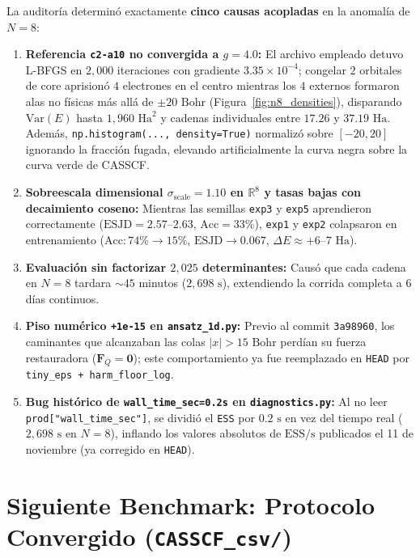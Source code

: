 \documentclass[10pt,a4paper]{article}
\begin{document}
La auditor\'ia determin\'o exactamente \textbf{cinco causas acopladas} en la anomal\'ia de $N=8$:
\begin{enumerate}
\item \textbf{Referencia \texttt{c2-a10} no convergida a $g=4.0$:} El archivo empleado detuvo L-BFGS en $2{,}000$ iteraciones con gradiente $3.35\times 10^{-4}$; congelar $2$ orbitales de core aprision\'o $4$ electrones en el centro mientras los $4$ externos formaron alas no f\'isicas m\'as all\'a de $\pm 20\text{ Bohr}$ (Figura~\ref{fig:n8_densities}), disparando $\mathrm{Var}(E)$ hasta $1{,}960\text{ Ha}^2$ y cadenas individuales entre $17.26$ y $37.19\text{ Ha}$. Adem\'as, \texttt{np.histogram(..., density=True)} normaliz\'o sobre $[-20,20]$ ignorando la fracci\'on fugada, elevando artificialmente la curva negra sobre la curva verde de CASSCF.
\item \textbf{Sobreescala dimensional $\sigma_{\mathrm{scale}}=1.10$ en $\mathbb{R}^8$ y tasas bajas con decaimiento coseno:} Mientras las semillas \texttt{exp3} y \texttt{exp5} aprendieron correctamente ($\mathrm{ESJD}=2.57\text{--}2.63$, $\text{Acc}=33\%$), \texttt{exp1} y \texttt{exp2} colapsaron en entrenamiento ($\text{Acc}: 74\% \to 15\%$, $\mathrm{ESJD}\to 0.067$, $\Delta E \approx +6\text{--}7\text{ Ha}$).
\item \textbf{Evaluaci\'on sin factorizar $2{,}025$ determinantes:} Caus\'o que cada cadena en $N=8$ tardara $\sim 45$ minutos ($2{,}698\text{ s}$), extendiendo la corrida completa a $6$ d\'ias continuos.
\item \textbf{Piso num\'erico \texttt{+1e-15} en \texttt{ansatz\_1d.py}:} Previo al commit \texttt{3a98960}, los caminantes que alcanzaban las colas $|x| > 15\text{ Bohr}$ perd\'ian su fuerza restauradora ($\mathbf{F}_Q = \mathbf{0}$); este comportamiento ya fue reemplazado en \texttt{HEAD} por \texttt{tiny\_eps + harm\_floor\_log}.
\item \textbf{Bug hist\'orico de \texttt{wall\_time\_sec=0.2s} en \texttt{diagnostics.py}:} Al no leer \texttt{prod["wall\_time\_sec"]}, se dividi\'o el \texttt{ESS} por $0.2\text{ s}$ en vez del tiempo real ($2{,}698\text{ s}$ en $N=8$), inflando los valores absolutos de $\mathrm{ESS/s}$ publicados el 11 de noviembre (ya corregido en \texttt{HEAD}).
\end{enumerate}

\section{Siguiente Benchmark: Protocolo Convergido (\texttt{CASSCF\_csv/})}
\end{document}
